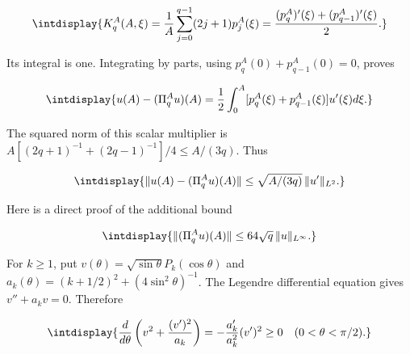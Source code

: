 \begingroup\renewcommand{\theHequation}{intdisplay.512}
\begin{equation*}
\intdisplay{
K_q^A(A,\xi)=\frac1A\sum_{j=0}^{q-1}(2j+1)p_j^A(\xi)
=\frac{(p_q^A)'(\xi)+(p_{q-1}^A)'(\xi)}2.
}
\end{equation*}
\endgroup


Its integral is one. Integrating by parts, using \(p_q^A(0)+p_{q-1}^A(0)=0\), proves


\begingroup\renewcommand{\theHequation}{intdisplay.513}
\begin{equation*}
\intdisplay{
u(A)-(\Pi_q^Au)(A)
=\frac12\int_0^A[p_q^A(\xi)+p_{q-1}^A(\xi)]u'(\xi)d\xi.
}
\end{equation*}
\endgroup


The squared norm of this scalar multiplier is \(A[(2q+1)^{-1}+(2q-1)^{-1}]/4\le A/(3q)\). Thus


\begingroup\renewcommand{\theHequation}{intdisplay.514}
\begin{equation}
\intdisplay{
\|u(A)-(\Pi_q^Au)(A)\|
\le\sqrt{A/(3q)}\,\|u'\|_{L^2}.
}
\label{int:eq-0218-legendre-endpoint-tail}
\end{equation}
\endgroup


Here is a direct proof of the additional bound


\begingroup\renewcommand{\theHequation}{intdisplay.515}
\begin{equation}
\intdisplay{
\|(\Pi_q^Au)(A)\|\le64\sqrt q\,\|u\|_{L^\infty}.
}
\label{int:eq-0219-legendre-endpoint-kernel}
\end{equation}
\endgroup


For \(k\ge1\), put \(v(\theta)=\sqrt{\sin\theta}P_k(\cos\theta)\) and \(a_k(\theta)=(k+1/2)^2+(4\sin^2\theta)^{-1}\). The Legendre differential equation gives \(v''+a_kv=0\). Therefore


\begingroup\renewcommand{\theHequation}{intdisplay.516}
\begin{equation*}
\intdisplay{
\frac d{d\theta}\left(v^2+\frac{(v')^2}{a_k}\right)
=-\frac{a_k'}{a_k^2}(v')^2\ge0
\quad(0<\theta<\pi/2).
}
\end{equation*}
\endgroup

